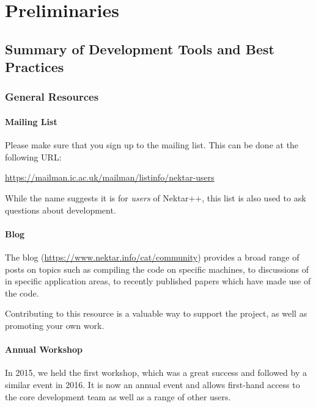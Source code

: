 
\chapter{Preliminaries}


\section{Summary of Development Tools and Best Practices}


\subsection{General Resources}

\subsubsection{Mailing List}

Please make sure that you sign up to the {\nek} mailing list. This can be done at the following URL:

\url{https://mailman.ic.ac.uk/mailman/listinfo/nektar-users}

While the name suggests it is for \textit{users} of Nektar++, this list is also used to ask questions about {\nek} development.

\subsubsection{Blog}

The {\nek} blog (\url{https://www.nektar.info/cat/community})
provides a broad range of posts on topics such as compiling the code
on specific machines, to discussions of {\nek} in specific
application areas, to recently published papers which have made use of
the code.

Contributing to this resource is a valuable way to support the project, as well as promoting your own work.

\subsubsection{Annual Workshop}

In 2015, we held the first {\nek} workshop, which was a great
success and followed by a similar event in 2016. It is now an annual
event and allows first-hand access to the core {\nek} development
team as well as a range of other {\nek} users.

